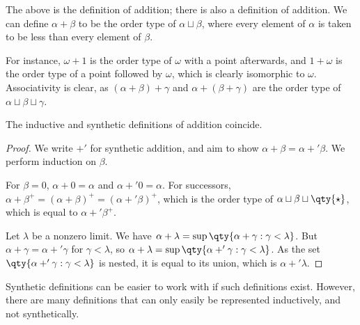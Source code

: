The above is the  definition of addition; there is also a  definition of addition.
We can define $\alpha + \beta$ to be the order type of $\alpha \sqcup \beta$, where every element of $\alpha$ is taken to be less than every element of $\beta$.

For instance, $\omega + 1$ is the order type of $\omega$ with a point afterwards, and $1 + \omega$ is the order type of a point followed by $\omega$, which is clearly isomorphic to $\omega$.
Associativity is clear, as $(\alpha + \beta) + \gamma$ and $\alpha + (\beta + \gamma)$ are the order type of $\alpha \sqcup \beta \sqcup \gamma$.
\begin{proposition}
    The inductive and synthetic definitions of addition coincide.
\end{proposition}
\begin{proof}
    We write $+'$ for synthetic addition, and aim to show $\alpha + \beta = \alpha +' \beta$.
    We perform induction on $\beta$.

    For $\beta = 0$, $\alpha + 0 = \alpha$ and $\alpha +' 0 = \alpha$.
    For successors, $\alpha + \beta^+ = (\alpha + \beta)^+ = (\alpha +' \beta)^+$, which is the order type of $\alpha \sqcup \beta \sqcup \qty{\star}$, which is equal to $\alpha +' \beta^+$.

    Let $\lambda$ be a nonzero limit.
    We have $\alpha + \lambda = \sup\qty{\alpha + \gamma : \gamma < \lambda}$.
    But $\alpha + \gamma = \alpha +' \gamma$ for $\gamma < \lambda$, so $\alpha + \lambda = \sup\qty{\alpha +' \gamma : \gamma < \lambda}$.
    As the set $\qty{\alpha +' \gamma : \gamma < \lambda}$ is nested, it is equal to its union, which is $\alpha +' \lambda$.
\end{proof}
Synthetic definitions can be easier to work with if such definitions exist.
However, there are many definitions that can only easily be represented inductively, and not synthetically.

